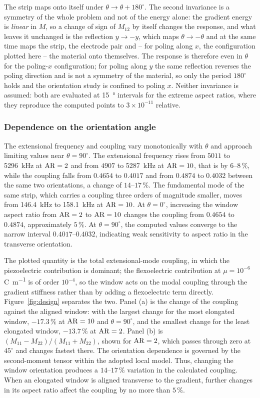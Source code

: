 The strip maps onto itself under $\theta\to\theta+180^\circ$. The second
invariance is a symmetry of the whole problem and not of the energy alone: the
gradient energy is \emph{linear} in $M$, so a change of sign of $M_{12}$ by
itself changes the response, and what leaves it unchanged is the reflection
$y\to-y$, which maps $\theta\to-\theta$ and at the same time maps the strip,
the electrode pair and -- for poling along $x$, the configuration plotted here
-- the material onto themselves. The response is therefore even in $\theta$ for
the poling-$x$ configuration; for poling along $y$ the same reflection reverses
the poling direction and is not a symmetry of the material, so only the period
$180^\circ$ holds and the orientation study is confined to poling $x$. Neither
invariance is assumed: both are evaluated at \SI{15}{\degree} intervals for the
extreme aspect ratios, where they reproduce the computed points to
$3\times10^{-11}$ relative.

\subsubsection{Dependence on the orientation angle}

The extensional frequency and coupling vary monotonically with $\theta$ and approach limiting values near
$\theta=90^\circ$. The extensional frequency rises from $5011$ to
\SI{5296}{kHz} at ${\rm AR}=2$ and from $4907$ to \SI{5287}{kHz} at
${\rm AR}=10$, that is by $6$--$8\,\%$, while the coupling falls from $0.4654$
to $0.4017$ and from $0.4874$ to $0.4032$ between the same two orientations, a
change of $14$--$17\,\%$. The fundamental mode of the same strip, which carries
a coupling three orders of magnitude smaller, moves from \SI{146.4}{kHz} to
\SI{158.1}{kHz} at ${\rm AR}=10$. At $\theta=0^\circ$, increasing the window aspect ratio from ${\rm AR}=2$
to ${\rm AR}=10$ changes the coupling from $0.4654$ to $0.4874$,
approximately $5\,\%$. At $\theta=90^\circ$, the computed values
converge to the narrow interval $0.4017$--$0.4032$, indicating weak
sensitivity to aspect ratio in the transverse orientation.

The plotted quantity is the total extensional-mode coupling, in which the
piezoelectric contribution is dominant; the flexoelectric contribution at
$\mu=10^{-6}$\,\si{\coulomb\per\meter} is of order $10^{-4}$,
so the window acts on the modal coupling through
the gradient stiffness rather than by adding a flexoelectric term directly.
Figure~\ref{fig:design} separates the two. Panel (a) is the change of the
coupling against the aligned window: with the largest change for the most elongated window,
$-17.3\,\%$ at ${\rm AR}=10$ and $\theta=90^\circ$, and the smallest change for the least elongated window, $-13.7\,\%$ at ${\rm AR}=2$. Panel (b) is
$(M_{11}-M_{22})/(M_{11}+M_{22})$, shown for ${\rm AR}=2$, which
passes through zero at $45^\circ$ and changes fastest there. The orientation dependence is governed by the second-moment tensor
within the adopted local model. Thus, changing the window orientation produces a $14$--$17\,\%$ variation
in the calculated coupling. When an elongated window is aligned transverse to
the gradient, further changes in its aspect ratio affect the coupling by no
more than $5\,\%$.

